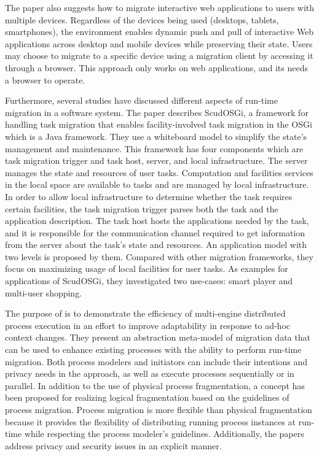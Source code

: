 The paper \cite{r6-10.1145/2254556.2254563} also suggests how to migrate interactive web applications to users with multiple devices.
Regardless of the devices being used (desktops, tablets, smartphones), the environment enables dynamic push and pull of interactive Web applications across desktop and mobile devices while preserving their state.
Users may choose to migrate to a specific device using a migration client by accessing it through a browser.
This approach only works on web applications, and its needs a browser to operate.

Furthermore, several studies have discussed different aspects of run-time migration in a software system. The paper \cite{r4-5392926} describes ScudOSGi, a framework for handling task migration that enables facility-involved task migration in the OSGi which is a Java framework.
They use a whiteboard model to simplify the state’s management and maintenance.
This framework has four components which are task migration trigger and task host, server, and local infrastructure. 
The server manages the state and resources of user tasks.
Computation and facilities services in the local space are available to tasks and are managed by local infrastructure.
In order to allow local infrastructure to determine whether the task requires certain facilities, the task migration trigger parses both the task and the application description.
The task host hosts the applications needed by the task, and it is responsible for the communication channel required to get information from the server about the task’s state and resources.
An application model with two levels is proposed by them. 
Compared with other migration frameworks, they focus on maximizing usage of local facilities for user tasks.
As examples for applications of ScudOSGi, they investigated two use-cases: smart player and multi-user shopping.

The purpose of \cite{r3-10.1145/2556288.2557199} is to demonstrate the efficiency of multi-engine distributed process execution in an effort to improve adaptability in response to ad-hoc context changes.
They present an abstraction meta-model of migration data that can be used to enhance existing processes with the ability to perform run-time migration.
Both process modelers and initiators can include their intentions and privacy needs in the approach, as well as execute processes sequentially or in parallel.
In addition to the use of physical process fragmentation, a concept has been proposed for realizing logical fragmentation based on the guidelines of process migration.
Process migration is more flexible than physical fragmentation because it provides the flexibility of distributing running process instances at run-time while respecting the process modeler’s guidelines.
Additionally, the papers address privacy and security issues in an explicit manner.

